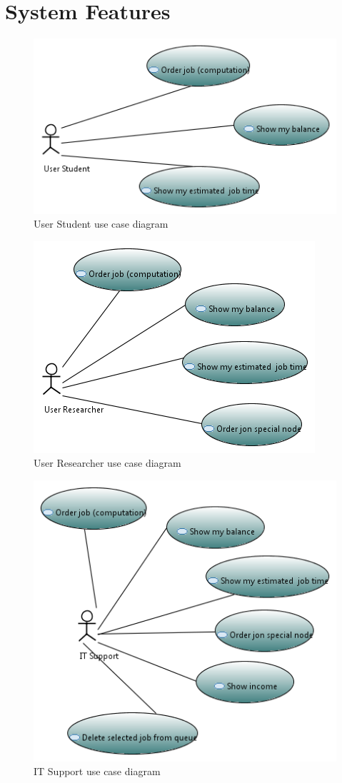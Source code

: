 \documentclass{scrreprt}
\begin{document}
\chapter{System Features}


\begin{figure}[h!]
\centering
\includegraphics{modelStudent.png}
\caption{User Student use case diagram}
\end{figure}
\FloatBarrier

\begin{figure}[h!]
\centering
\includegraphics{modelResearcher.png}
\caption{User Researcher use case diagram}
\end{figure}
\FloatBarrier

\begin{figure}[h!]
\centering
\includegraphics{modelIT.png}
\caption{IT Support use case diagram}
\end{figure}
\FloatBarrier
\end{document}
